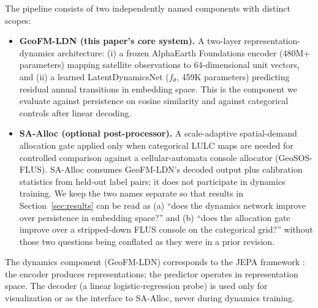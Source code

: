 \documentclass{article}
\begin{document}
The pipeline consists of two independently named components with distinct scopes:

\begin{itemize}
\item \textbf{GeoFM-LDN (this paper's core system).} A two-layer representation-dynamics architecture: (i) a frozen AlphaEarth Foundations encoder (480M+ parameters) mapping satellite observations to 64-dimensional unit vectors, and (ii) a learned LatentDynamicsNet ($f_\theta$, 459K parameters) predicting residual annual transitions in embedding space. This is the component we evaluate against persistence on cosine similarity and against categorical controls after linear decoding.
\item \textbf{SA-Alloc (optional post-processor).} A scale-adaptive spatial-demand allocation gate applied only when categorical LULC maps are needed for controlled comparison against a cellular-automata console allocator (GeoSOS-FLUS). SA-Alloc consumes GeoFM-LDN's decoded output plus calibration statistics from held-out label pairs; it does not participate in dynamics training. We keep the two names separate so that results in Section~\ref{sec:results} can be read as (a) ``does the dynamics network improve over persistence in embedding space?'' and (b) ``does the allocation gate improve over a stripped-down FLUS console on the categorical grid?'' without those two questions being conflated as they were in a prior revision.
\end{itemize}

The dynamics component (GeoFM-LDN) corresponds to the JEPA framework \citep{lecun2022jepa}: the encoder produces representations; the predictor operates in representation space. The decoder (a linear logistic-regression probe) is used only for visualization or as the interface to SA-Alloc, never during dynamics training.
\end{document}
